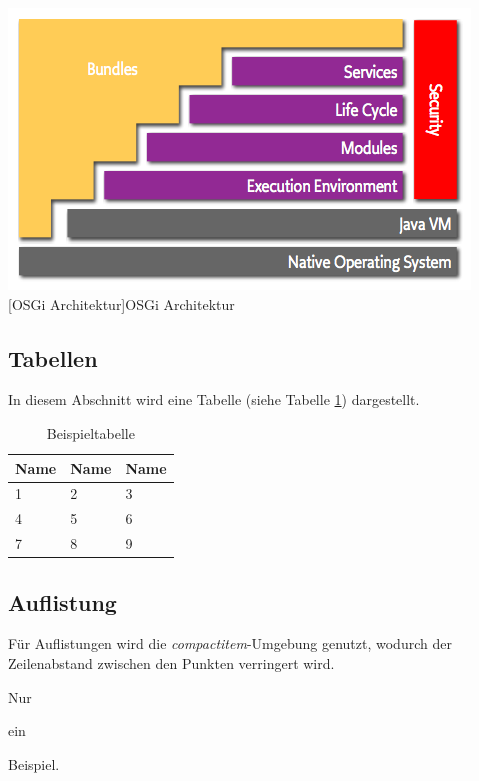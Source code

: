 \documentclass[12pt,a4paper,bibliography=totocnumbered,listof=totocnumbered]{scrartcl}
\begin{document}
\vspace{1em}
\begin{minipage}{\linewidth}
	\centering
	\includegraphics[width=0.7\linewidth]{Bilder/layering-osgi.png}
	[OSGi Architektur]{OSGi Architektur\footnotemark }
	\label{fig:osgi}
\end{minipage}

\subsection{Tabellen}
In diesem Abschnitt wird eine Tabelle (siehe Tabelle \ref{tab:beispiel}) dargestellt.

\vspace{1em}
\begin{table}[!h]
	\centering
	\begin{tabular}{|l|l|l|}
		\hline
		\textbf{Name} & \textbf{Name} & \textbf{Name}\\
		\hline
		1 & 2 & 3\\
		\hline
		4 & 5 & 6\\
		\hline
		7 & 8 & 9\\
		\hline
	\end{tabular}
	\caption{Beispieltabelle}
	\label{tab:beispiel}
\end{table}

\pagebreak
\subsection{Auflistung}
Für Auflistungen wird die \textit{compactitem}-Umgebung genutzt, wodurch der Zeilenabstand zwischen den Punkten verringert wird.

\begin{compactitem}
	\item Nur
	\item ein
	\item Beispiel.
\end{compactitem}
\end{document}

